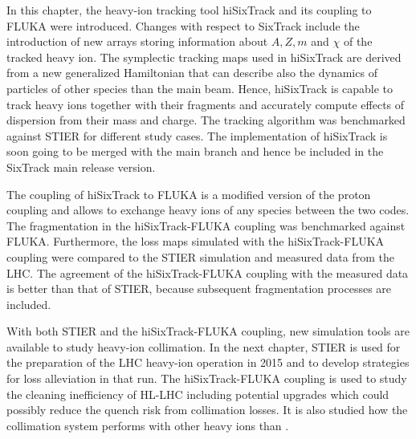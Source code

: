 In this chapter, the heavy-ion tracking tool hiSixTrack and its coupling to FLUKA were introduced. Changes with respect to SixTrack include the introduction of new arrays storing information about $A,Z,m$ and $\chi$ of the tracked heavy ion. The symplectic tracking maps used in hiSixTrack are derived from a new generalized Hamiltonian that can describe also the dynamics of particles of other species than the main beam. Hence, hiSixTrack is capable to track heavy ions together with their fragments and accurately compute effects of dispersion from their mass and charge. The tracking algorithm was benchmarked against STIER for different study cases. The implementation of hiSixTrack is soon going to be merged with the main branch and hence be included in the SixTrack main release version.

The coupling of hiSixTrack to FLUKA is a modified version of the proton coupling and allows to exchange heavy ions of any species between the two codes. The fragmentation in the hiSixTrack-FLUKA coupling was benchmarked against FLUKA. Furthermore, the loss maps simulated with the hiSixTrack-FLUKA coupling were compared to the STIER simulation and measured data from the LHC. The agreement of the hiSixTrack-FLUKA coupling with the measured data is better than that of STIER, because subsequent fragmentation processes are included.

With both STIER and the hiSixTrack-FLUKA coupling, new simulation tools are available to study heavy-ion collimation. In the next chapter, STIER is used for the preparation of the LHC heavy-ion operation in 2015 and to develop strategies for loss alleviation in that run. The hiSixTrack-FLUKA coupling is used to study the cleaning inefficiency of HL-LHC including potential upgrades which could possibly reduce the quench risk from collimation losses. It is also studied how the collimation system performs with other heavy ions than \lead. 
